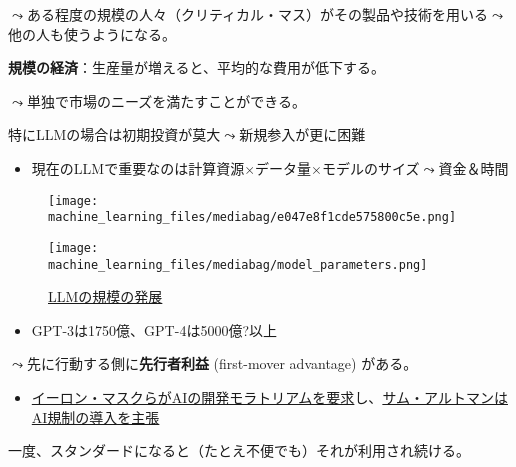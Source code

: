 \documentclass[
  xelatex,
  ja=standard]{bxjsarticle}
\providecommand{\tightlist}{%
  \setlength{\itemsep}{0pt}\setlength{\parskip}{0pt}}\usepackage{longtable,booktabs,array}
\begin{document}
\(\leadsto\)ある程度の規模の人々（クリティカル・マス）がその製品や技術を用いる\(\leadsto\)他の人も使うようになる。

\textbf{規模の経済}：生産量が増えると、平均的な費用が低下する。

\(\leadsto\)単独で市場のニーズを満たすことができる。

特にLLMの場合は初期投資が莫大\(\leadsto\)新規参入が更に困難

\begin{itemize}
\tightlist
\item
  現在のLLMで重要なのは計算資源\(\times\)データ量\(\times\)モデルのサイズ\(\leadsto\)資金＆時間
\end{itemize}

\begin{figure}[htpb]

{\centering \texttt{[image: machine\_learning\_files/mediabag/e047e8f1cde575800c5e.png]}

}

\caption{\citet{kaplan2020}}

\end{figure}

\begin{figure}[htpb]

{\centering \texttt{[image: machine\_learning\_files/mediabag/model\_parameters.png]}

}

\caption{\href{https://huggingface.co/learn/nlp-course/ja/chapter1/4?fw=pt}{LLMの規模の発展}}

\end{figure}

\begin{itemize}
\tightlist
\item
  GPT-3は1750億、GPT-4は5000億?以上
\end{itemize}

\(\leadsto\)先に行動する側に\textbf{先行者利益} (first-mover advantage)
がある。

\begin{itemize}
\tightlist
\item
  \href{https://jp.reuters.com/article/elon-musk-ai-idJPKBN2VV0CW}{イーロン・マスクらがAIの開発モラトリアムを要求}し、\href{https://www.bloomberg.co.jp/news/articles/2023-05-16/RUREP2T0G1KW01}{サム・アルトマンはAI規制の導入を主張}
\end{itemize}

一度、スタンダードになると（たとえ不便でも）それが利用され続ける。
\end{document}
